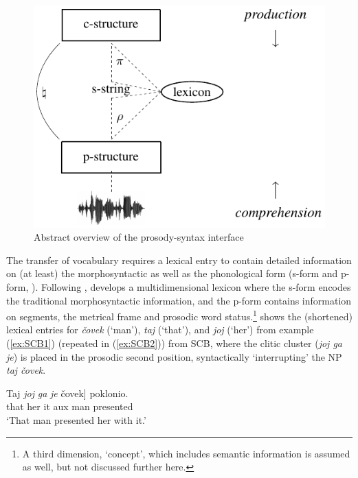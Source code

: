 \documentclass[output=paper,hidelinks]{langscibook}
\begin{document}
\begin{figure}
\centering
\includegraphics[width=.5\textwidth]{figures/Prosody/Boegel_Figure_18.pdf}
\caption{Abstract overview of the prosody-syntax interface \citep{Boegel2015}}
\label{fig:Prosody:16}
\end{figure}

The transfer of vocabulary requires a lexical entry to contain detailed information on (at least) the morphosyntactic as well as the phonological form (s-form and p-form,  \citealt{DM11}). Following \citet{Leveltetal1999}, \citet{Boegel2015} develops a multidimensional lexicon where the s-form encodes the traditional morphosyntactic information, and the p-form contains information on segments, the metrical frame and prosodic word status.\footnote{A third dimension, `concept', which includes semantic information is assumed as well, but not discussed  further here.}  shows the (shortened) lexical entries for {\em  \v{c}ovek} (`man'), {\em taj} (`that'), and {\em joj} (`her') from example (\ref{ex:SCB1})  (repeated in (\ref{ex:SCB2})) from SCB, where the clitic cluster ({\em joj ga je}) is placed in the prosodic second position, syntactically `interrupting' the NP {\em taj  \v{c}ovek}. 

\ea\label{ex:SCB2}
\gll {[}Taj   {\em joj} {\em  ga} {\em je}      \v{c}ovek] poklonio.\\
\phantom{[}that   her  it  {\sc aux}   man     presented\\
\glt `That man presented her with it.' \hfill\citep{Schuetze1994}
\z
\end{document}

